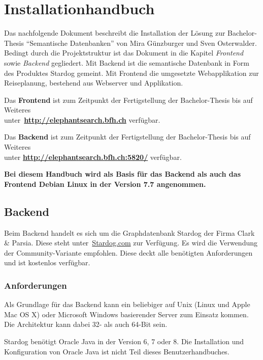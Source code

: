 \chapter{Installationhandbuch}
\label{chap:anh:ihb}
Das nachfolgende Dokument beschreibt die Installation der Lösung zur Bachelor-Thesis ``Semantische Datenbanken'' von Mira Günzburger und Sven Osterwalder. Bedingt durch die Projektstruktur ist das Dokument in die Kapitel \textit{Frontend} sowie \textit{Backend} gegliedert. Mit Backend ist die semantische Datenbank in Form des Produktes Stardog gemeint. Mit Frontend die umgesetzte Webapplikation zur Reiseplanung, bestehend aus Webserver und Applikation.

Das \textbf{Frontend} ist zum Zeitpunkt der Fertigstellung der Bachelor-Thesis bis auf Weiteres\\
unter~\href{http://elephantsearch.bfh.ch}{\textbf{http://elephantsearch.bfh.ch}} verfügbar.

Das \textbf{Backend} ist zum Zeitpunkt der Fertigstellung der Bachelor-Thesis bis auf Weiteres\\
unter \href{http://elephantsearch.bfh.ch:5820/}{\textbf{http://elephantsearch.bfh.ch:5820/}} verfügbar.

\textbf{Bei diesem Handbuch wird als Basis für das Backend als auch das Frontend Debian Linux in der Version 7.7 angenommen.}

\section{Backend}
\label{chap:anh:ihb:backend}
Beim Backend handelt es sich um die Graphdatenbank Stardog der Firma Clark \& Parsia. Diese steht unter~\href{http://www.stardog.com/\#download}{Stardog.com} zur Verfügung. Es wird die Verwendung der Community-Variante empfohlen. Diese deckt alle benötigten Anforderungen und ist kostenlos verfügbar.

\subsection{Anforderungen}
\label{chap:anh:ihb:backend:req}
Als Grundlage für das Backend kann ein beliebiger auf Unix (Linux und Apple Mac OS X) oder Microsoft Windows basierender Server zum Einsatz kommen. Die Architektur kann dabei 32- als auch 64-Bit sein.

Stardog benötigt Oracle Java in der Version 6, 7 oder 8.
Die Installation und Konfiguration von Oracle Java ist nicht Teil dieses Benutzerhandbuches.

